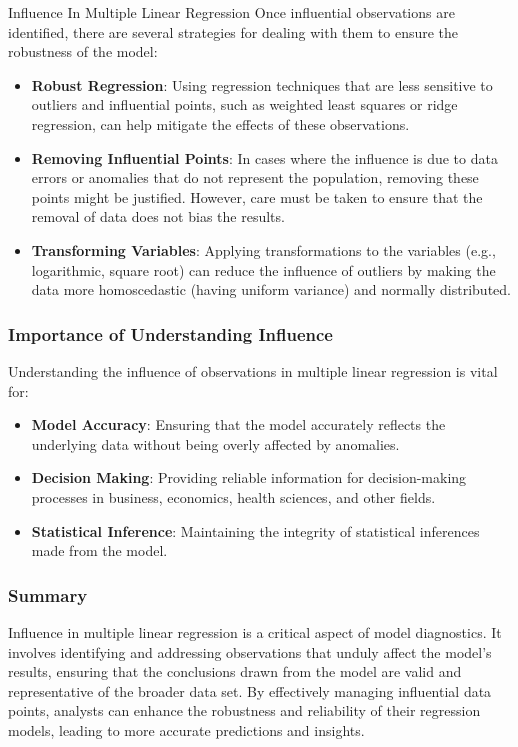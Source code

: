\begin{notes}{Influence In Multiple Linear Regression}
    Once influential observations are identified, there are several strategies for dealing with them to ensure the robustness of the model:
    
    \begin{itemize}
        \item \textbf{Robust Regression}: Using regression techniques that are less sensitive to outliers and influential points, such as weighted least squares or ridge regression, can help mitigate 
        the effects of these observations.
        \item \textbf{Removing Influential Points}: In cases where the influence is due to data errors or anomalies that do not represent the population, removing these points might be justified. 
        However, care must be taken to ensure that the removal of data does not bias the results.
        \item \textbf{Transforming Variables}: Applying transformations to the variables (e.g., logarithmic, square root) can reduce the influence of outliers by making the data more homoscedastic 
        (having uniform variance) and normally distributed.
    \end{itemize}
    
    \subsubsection*{Importance of Understanding Influence}
    
    Understanding the influence of observations in multiple linear regression is vital for:
    \begin{itemize}
        \item \textbf{Model Accuracy}: Ensuring that the model accurately reflects the underlying data without being overly affected by anomalies.
        \item \textbf{Decision Making}: Providing reliable information for decision-making processes in business, economics, health sciences, and other fields.
        \item \textbf{Statistical Inference}: Maintaining the integrity of statistical inferences made from the model.
    \end{itemize}
    
    \subsubsection*{Summary}
    
    Influence in multiple linear regression is a critical aspect of model diagnostics. It involves identifying and addressing observations that unduly affect the model's results, ensuring that the 
    conclusions drawn from the model are valid and representative of the broader data set. By effectively managing influential data points, analysts can enhance the robustness and reliability of 
    their regression models, leading to more accurate predictions and insights.    
\end{notes}